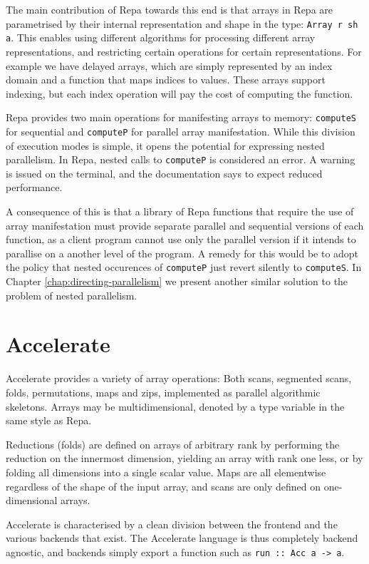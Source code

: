 The main contribution of Repa towards this end is that arrays in Repa are
parametrised by their internal representation and shape in the type:
\texttt{Array r sh a}.  This enables using different algorithms for processing
different array representations, and restricting certain operations for certain
representations. For example we have delayed arrays, which are simply
represented by an index domain and a function that maps indices to values.
These arrays support indexing, but each index operation will pay the cost of
computing the function.

Repa provides two main operations for manifesting arrays to memory:
\texttt{computeS} for sequential and \texttt{computeP} for parallel array
manifestation. While this division of execution modes is simple, it opens the
potential for expressing nested parallelism. In Repa, nested calls to
\texttt{computeP} is considered an error. A warning is issued on the terminal,
and the documentation says to expect reduced performance.

A consequence of this is that a library of Repa functions that require the use
of array manifestation must provide separate parallel and sequential versions
of each function, as a client program cannot use only the parallel version if
it intends to parallise on a another level of the program.  A remedy for this
would be to adopt the policy that nested occurences of \texttt{computeP} just
revert silently to \texttt{computeS}. In Chapter
\ref{chap:directing-parallelism} we present another similar solution to the
problem of nested parallelism.

\section{Accelerate}
\label{sec:language-discussion-accelerate}
Accelerate provides a variety of array operations: Both scans,
segmented scans, folds, permutations, maps and zips, implemented as
parallel algorithmic skeletons. Arrays may be multidimensional,
denoted by a type variable in the same style as Repa.

Reductions (folds) are defined on arrays of arbitrary rank by
performing the reduction on the innermost dimension, yielding an array
with rank one less, or by folding all dimensions into a single scalar
value.  Maps are all elementwise regardless of the shape of the input
array, and scans are only defined on one-dimensional arrays.

Accelerate is characterised by a clean division between the frontend and the
various backends that exist. The Accelerate language is thus completely backend
agnostic, and backends simply export a function such as \hbox{\texttt{run :: Acc a ->
a}.}

